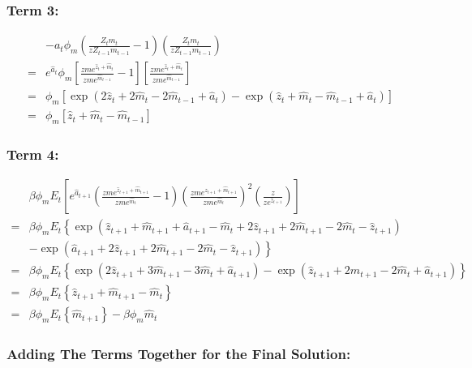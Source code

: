 \documentclass[11pt,preprint, authoryear]{elsarticle}
\numberwithin{equation}{section}
\numberwithin{figure}{section}
\numberwithin{table}{section}
\begin{document}
\hypertarget{term-3-1}{%
\subsubsection{Term 3:}\label{term-3-1}}

\[\begin{aligned} &-a_{t} \phi_{m}\left(\frac{Z_t m_t }{z Z_{t-1}m_{t-1}} - 1\right)\left(\frac{Z_t m_t }{z Z_{t-1}m_{t-1}}\right)\\
=& e^{\hat{a}_{t}} \phi_{m}\left[\frac{z m e^{\hat{z}_{t}+\hat{m}_{t}}}{z m e^{\hat{m}_{t-1}}}-1\right]\left[\frac{z m e^{\hat{z}_{t}+\hat{m}_{t}}}{z m e^{\hat{m}_{t-1}}}\right]\\
=& \phi_m \left[ \exp \left(2 \hat{z}_{t}+2 \hat{m}_{t}-2 \hat{m}_{t-1}+\hat{a}_{t}\right)-\exp \left(\hat{z}_{t}+\hat{m}_{t}-\hat{m}_{t-1}+\hat{a}_{t}\right) \right]\\
=& \phi_m \left[\hat{z}_{t}+\hat{m}_{t}-\hat{m}_{t-1}\right]
\end{aligned}\]

\hypertarget{term-4-1}{%
\subsubsection{Term 4:}\label{term-4-1}}

\[\begin{aligned}&\beta \phi_{m} E_{t}\left[e^{\hat{a}_{t+1}}\left(\frac{z m e^{\hat{z}_{t+1}+\hat{m}_{t+1}}}{z m e^{\hat{m}_{t}}}-1\right)\left(\frac{z m e^{\hat{z}_{t+1}+\hat{m}_{t+1}}}{z m e^{\hat{m}_{t}}}\right)^{2} \left(\frac{z}{z e^{\hat{z}_{t+1}}}\right)\right] \\
=&\beta \phi_{m} E_{t}\left\{\exp \left(\hat{z}_{t+1}+\hat{m}_{t+1}+\hat{a}_{t+1}-\hat{m}_{t}+2 \hat{z}_{t+1}+2 \hat{m}_{t+1}-2 \hat{m}_{t}-\hat{z}_{t+1}\right)\right. \\
& \left.-\exp \left(\hat{a}_{t+1}+2 \hat{z}_{t+1}+2 \hat{m}_{t+1}-2 \hat{m}_{t}-\hat{z}_{t+1}\right)\right\} \\
=&\beta \phi_{m} E_{t}\left\{\exp \left(2 \hat{z}_{t+1}+3 \hat{m}_{t+1}-3 \hat{m}_{t}+\hat{a}_{t+1}\right)-\exp \left(\hat{z}_{t+1}+2 \hat{m}_{t+1}-2 \hat{m}_{t}+\hat{a}_{t+1}\right)\right\} \\
=&\beta \phi_{m} E_{t}\left\{\hat{z}_{t+1}+\hat{m}_{t+1}-\hat{m}_{t}\right\}\\
=& \beta \phi_{m} E_{t}\left\{\hat{m}_{t+1}\right\} - \beta \phi_m \hat{m}_{t}
\end{aligned}\]

\hypertarget{adding-the-terms-together-for-the-final-solution}{%
\subsubsection{Adding The Terms Together for the Final
Solution:}\label{adding-the-terms-together-for-the-final-solution}}
\end{document}

